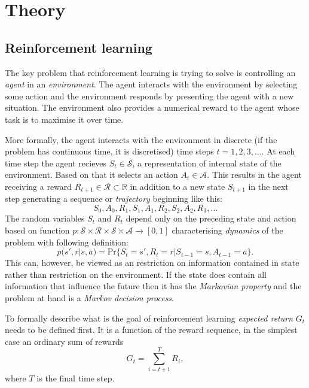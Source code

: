 \chapter{Theory}
\label{chap:theory}

\section{Reinforcement learning}
\label{sec:reinf}
The key problem that reinforcement learning is trying to solve is controlling an \emph{agent} in an \emph{environment}. The agent interacts with the environment by selecting some action and the environment responds by presenting the agent with a new situation. The environment also provides a numerical reward to the agent whose task is to maximise it over time.

More formally, the agent interacts with the environment in discrete (if the problem has continuous time, it is discretised) time steps $t=1,2,3,\dots$. At each time step the agent recieves $S_t\in\mathcal{S}$, a representation of internal state of the environment. Based on that it selects an action $A_t\in\mathcal{A}$. This results in the agent receiving a reward $R_{t+1}\in \mathcal{R}\subset \mathbb{R}$ in addition to a new state $S_{t+1}$ in the next step generating a sequence or \emph{trajectory} beginning like this:
\begin{equation}
    S_0,A_0,R_1,S_1,A_1,R_2,S_2,A_2,R_3,\dots
\end{equation}
The random variables $S_t$ and $R_t$ depend only on the preceding state and action based on function $p: \mathcal{S} \times \mathcal{R} \times \mathcal{S} \times\mathcal{A} \rightarrow [0,1]$ characterising \emph{dynamics} of the problem with following definition:
\begin{equation}
    p(s',r|s,a) = \text{Pr}\{S_t=s',R_t=r|S_{t-1}=s, A_{t-1}=a\}.
\end{equation}
This can, however, be viewed as an restriction on information contained in state rather than restriction on the environment. If the state does contain all information that influence the future then it has the \emph{Markovian property} and the problem at hand is a \emph{Markov decision process}.

To formally describe what is the goal of reinforcement learning \emph{expected return} $G_t$ needs to be defined first. It is a function of the reward sequence, in the simplest case an ordinary sum of rewards 
\begin{equation}
    \label{eq:exp-ret}
    G_t = \sum_{i=t+1}^TR_i,
\end{equation}
where $T$ is the final time step. 

